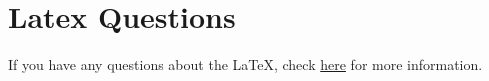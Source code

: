 \chapter{Latex Questions}
If you have any questions about the \LaTeX, check \href{https://www.latex-project.org/}{here} for more information. 